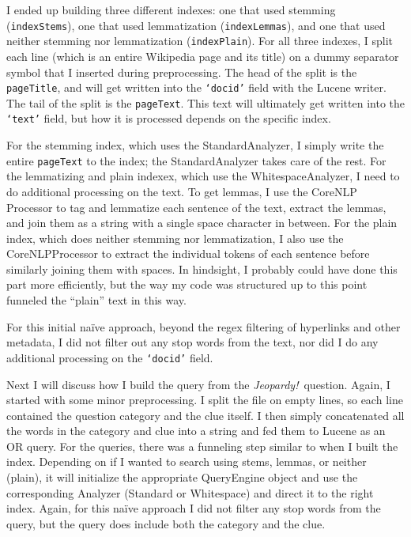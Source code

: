 \documentclass[11pt,letterpaper]{article}
\begin{document}
I ended up building three different indexes:  one that used stemming (\texttt{indexStems}), one that used lemmatization (\texttt{indexLemmas}), and one that used neither stemming nor lemmatization (\texttt{indexPlain}).
For all three indexes, I split each line (which is an entire Wikipedia page and its title) on a dummy separator symbol that I inserted during preprocessing.
The head of the split is the \texttt{pageTitle}, and will get written into the \texttt{`docid'} field with the Lucene writer.
The tail of the split is the \texttt{pageText}.
This text will ultimately get written into the \texttt{`text'} field, but how it is processed depends on the specific index.


For the stemming index, which uses the StandardAnalyzer, I simply write the entire \texttt{pageText} to the index; the StandardAnalyzer takes care of the rest.
For the lemmatizing and plain indexex, which use the WhitespaceAnalyzer, I need to do additional processing on the text.
To get lemmas, I use the CoreNLP Processor to tag and lemmatize each sentence of the text, extract the lemmas, and join them as a string with a single space character in between.
For the plain index, which does neither stemming nor lemmatization, I also use the CoreNLPProcessor to extract the individual tokens of each sentence before similarly joining them with spaces.
In hindsight, I probably could have done this part more efficiently, but the way my code was structured up to this point funneled the ``plain'' text in this way.

For this initial na\"ive approach, beyond the regex filtering of hyperlinks and other metadata, I did not filter out any stop words from the text, nor did I do any additional processing on the \texttt{`docid'} field.

Next I will discuss how I build the query from the \textit{Jeopardy!}~question.
Again, I started with some minor preprocessing.
I split the file on empty lines, so each line contained the question category and the clue itself.
I then simply concatenated all the words in the category and clue into a string and fed them to Lucene as an OR query.
For the queries, there was a funneling step similar to when I built the index.
Depending on if I wanted to search using stems, lemmas, or neither (plain), it will initialize the appropriate QueryEngine object and use the corresponding Analyzer (Standard or Whitespace) and direct it to the right index.
Again, for this na\"ive approach I did not filter any stop words from the query, but the query does include both the category and the clue.
\end{document}
